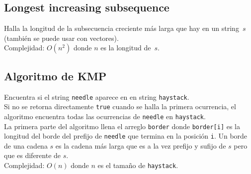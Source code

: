 \documentclass[10pt,letterpaper,twocolumn]{article}
\newcommand{\source}[1]{
	
	\dotfill
}
\begin{document}
	\subsection{Longest increasing subsequence}
	Halla la longitud de la subsecuencia creciente más larga que hay en un string~$s$ (también se puede usar con vectores).\\
	Complejidad: $O(n^2)$ donde $n$ es la longitud de~$s$.\\
	\source{./src/lis.cpp}
	
	\subsection{Algoritmo de KMP}
	Encuentra si el string \verb|needle| aparece en en string \verb|haystack|.\\
	Si no se retorna directamente \verb|true| cuando se halla la primera ocurrencia, el algoritmo encuentra todas las ocurrencias de \verb|needle| en \verb|haystack|.\\
	La primera parte del algoritmo llena el arreglo \verb|border| donde \verb|border[i]| es la longitud del borde del prefijo de \verb|needle| que termina en la posición \verb|i|. Un borde de una cadena $s$ es la cadena más larga que es a la vez prefijo y sufijo de $s$ pero que es diferente de $s$.\\
	Complejidad: $O(n)$ donde $n$ es el tamaño de \verb|haystack|.\\
	\source{./src/kmp.cpp}
	
\end{document}

